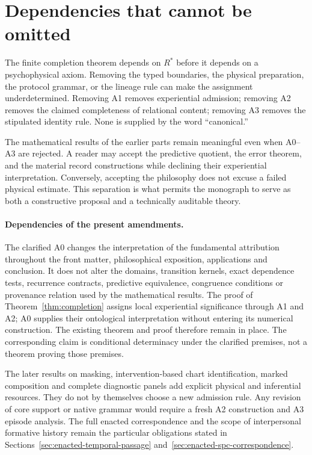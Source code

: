 \section{Dependencies that cannot be omitted}\label{section:ledger:dependencies-that-cannot-be-omitted}
The finite completion theorem depends on $R^\ast$ before it depends on a psychophysical axiom. Removing the typed boundaries, the physical preparation, the protocol grammar, or the lineage rule can make the assignment underdetermined. Removing A1 removes experiential admission; removing A2 removes the claimed completeness of relational content; removing A3 removes the stipulated identity rule. None is supplied by the word ``canonical.''

The mathematical results of the earlier parts remain meaningful even when A0--A3 are rejected. A reader may accept the predictive quotient, the error theorem, and the material record constructions while declining their experiential interpretation. Conversely, accepting the philosophy does not excuse a failed physical estimate. This separation is what permits the monograph to serve as both a constructive proposal and a technically auditable theory.

\paragraph{Dependencies of the present amendments.}
The clarified A0 changes the interpretation of the fundamental attribution throughout the front matter, philosophical exposition, applications and conclusion. It does not alter the domains, transition kernels, exact dependence tests, recurrence contracts, predictive equivalence, congruence conditions or provenance relation used by the mathematical results. The proof of Theorem~\ref{thm:completion} assigns local experiential significance through A1 and A2; A0 supplies their ontological interpretation without entering its numerical construction. The existing theorem and proof therefore remain in place. The corresponding claim is conditional determinacy under the clarified premises, not a theorem proving those premises.

The later results on masking, intervention-based chart identification, marked composition and complete diagnostic panels add explicit physical and inferential resources. They do not by themselves choose a new admission rule. Any revision of core support or native grammar would require a fresh A2 construction and A3 episode analysis. The full enacted correspondence and the scope of interpersonal formative history remain the particular obligations stated in Sections~\ref{sec:enacted-temporal-passage} and~\ref{sec:enacted-spc-correspondence}.

